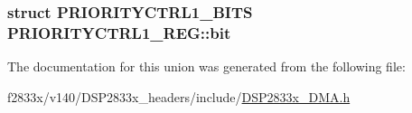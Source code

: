 \subsubsection[{bit}]{\setlength{\rightskip}{0pt plus 5cm}struct {\bf P\+R\+I\+O\+R\+I\+T\+Y\+C\+T\+R\+L1\+\_\+\+B\+I\+T\+S} P\+R\+I\+O\+R\+I\+T\+Y\+C\+T\+R\+L1\+\_\+\+R\+E\+G\+::bit}\label{union_p_r_i_o_r_i_t_y_c_t_r_l1___r_e_g_aefd58a64e6f30371404d82a13bbfc2b1}


The documentation for this union was generated from the following file\+:\begin{DoxyCompactItemize}
\item 
f2833x/v140/\+D\+S\+P2833x\+\_\+headers/include/\hyperlink{_d_s_p2833x___d_m_a_8h}{D\+S\+P2833x\+\_\+\+D\+M\+A.\+h}\end{DoxyCompactItemize}

